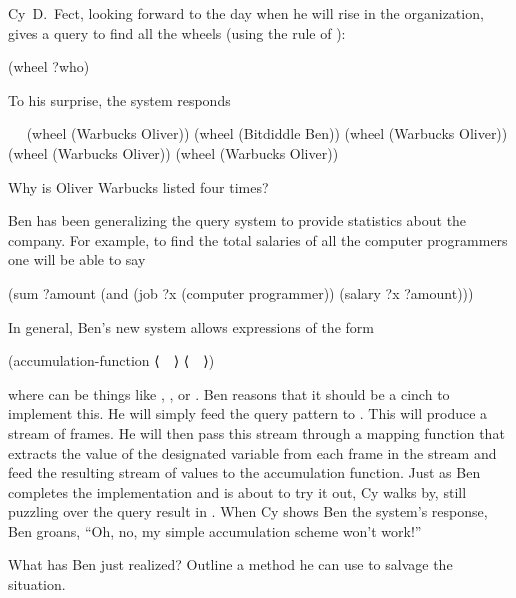 \begin{exercise}
	\label{Exercise 4.65}
	Cy D. Fect, looking forward to the day when he will rise in the organization, gives a query to find all the wheels (using the  rule of ):
	\begin{scheme}
	  (wheel ?who)
	\end{scheme}
	To his surprise, the system responds
	\begin{scheme}
	  ~~
	  (wheel (Warbucks Oliver))
	  (wheel (Bitdiddle Ben))
	  (wheel (Warbucks Oliver))
	  (wheel (Warbucks Oliver))
	  (wheel (Warbucks Oliver))
	\end{scheme}
	Why is Oliver Warbucks listed four times?
\end{exercise}



\begin{exercise}
	\label{Exercise 4.66}
	Ben has been generalizing the query system to provide statistics about the company.
	For example, to find the total salaries of all the computer programmers one will be able to say
	\begin{scheme}
	  (sum ?amount (and (job ?x (computer programmer))
	                    (salary ?x ?amount)))
	\end{scheme}
	In general, Ben’s new system allows expressions of the form
	\begin{scheme}
	  (accumulation-function ⟨~~⟩ ⟨~~⟩)
	\end{scheme}
	where  can be things like , , or .
	Ben reasons that it should be a cinch to implement this.
	He will simply feed the query pattern to .
	This will produce a stream of frames.
	He will then pass this stream through a mapping function that extracts the value of the designated variable from each frame in the stream and feed the resulting stream of values to the accumulation function.
	Just as Ben completes the implementation and is about to try it out, Cy walks by, still puzzling over the  query result in .
	When Cy shows Ben the system’s response, Ben groans, “Oh, no, my simple accumulation scheme won’t work!”

	What has Ben just realized?
	Outline a method he can use to salvage the situation.
\end{exercise}



